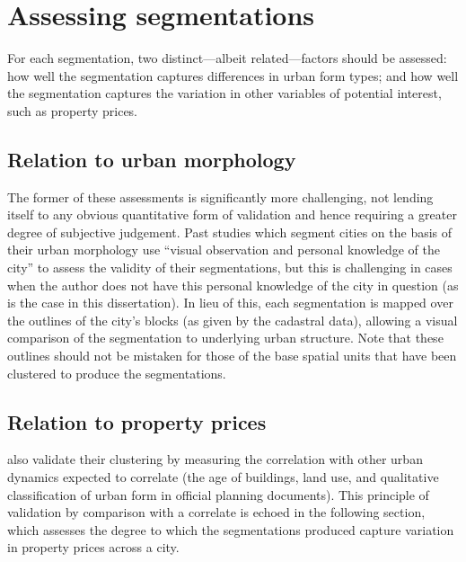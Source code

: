 \documentclass[a4paper, nobind]{templates/ociamthesis}
\begin{document}
\hypertarget{assessing-segmentations}{%
\section{Assessing segmentations}\label{assessing-segmentations}}

For each segmentation, two distinct---albeit related---factors should be assessed: how well the segmentation captures differences in urban form types; and how well the segmentation captures the variation in other variables of potential interest, such as property prices.

\hypertarget{relation-to-urban-morphology}{%
\subsection{Relation to urban morphology}\label{relation-to-urban-morphology}}

The former of these assessments is significantly more challenging, not lending itself to any obvious quantitative form of validation and hence requiring a greater degree of subjective judgement. Past studies which segment cities on the basis of their urban morphology use ``visual observation and personal knowledge of the city'' \citep[20]{fleischmann2021} to assess the validity of their segmentations, but this is challenging in cases when the author does not have this personal knowledge of the city in question (as is the case in this dissertation). In lieu of this, each segmentation is mapped over the outlines of the city's blocks (as given by the cadastral data), allowing a visual comparison of the segmentation to underlying urban structure. Note that these outlines should not be mistaken for those of the base spatial units that have been clustered to produce the segmentations.

\hypertarget{relation-to-property-prices}{%
\subsection{Relation to property prices}\label{relation-to-property-prices}}

\citet{fleischmann2021} also validate their clustering by measuring the correlation with other urban dynamics expected to correlate (the age of buildings, land use, and qualitative classification of urban form in official planning documents). This principle of validation by comparison with a correlate is echoed in the following section, which assesses the degree to which the segmentations produced capture variation in property prices across a city.
\end{document}
